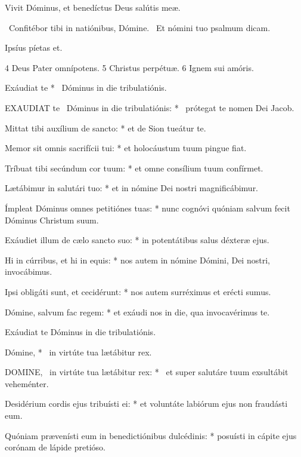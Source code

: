  Vivit Dóminus, et benedíctus Deus salútis meæ.


\V\ Confitébor tibi in natiónibus, Dómine. \R\ Et nómini tuo psalmum dicam.

 Ipsíus píetas et.

 4 Deus Pater omnípotens. 5 Christus perpétuæ. 6 Ignem sui amóris.


 Exáudiat te * \textdagger\ Dóminus in die tribulatiónis. \textdagger


\lettrine[lines=2]{E}{XAUDIAT} te \textdagger\ Dóminus in die tribulatiónis: * \textdagger\ prótegat te nomen Dei Jacob.

Mittat tibi auxílium de sancto: * et de Sion tueátur te.

Memor sit omnis sacrifícii tui: * et holocáustum tuum pingue fiat.

Tríbuat tibi secúndum cor tuum: * et omne consílium tuum confírmet.

Lætábimur in salutári tuo: * et in nómine Dei nostri magnificábimur.

Ímpleat Dóminus omnes petitiónes tuas: * nunc cognóvi quóniam salvum fecit Dóminus Christum suum.

Exáudiet illum de cælo sancto suo: * in potentátibus salus déxteræ ejus.

Hi in cúrribus, et hi in equis: * nos autem in nómine Dómini, Dei nostri, invocábimus.

Ipsi obligáti sunt, et cecidérunt: * nos autem surréximus et erécti sumus.

Dómine, salvum fac regem: * et exáudi nos in die, qua invocavérimus te.

 Exáudiat te Dóminus in die tribulatiónis.

 Dómine, * \textdagger\ in virtúte tua lætábitur rex. \textdaggerdbl


\lettrine[lines=2]{D}{OMINE}, \textdagger\ in virtúte tua lætábitur rex: * \textdaggerdbl\ et super salutáre tuum exsultábit veheménter.

Desidérium cordis ejus tribuísti ei: * et voluntáte labiórum ejus non fraudásti eum.

Quóniam prævenísti eum in benedictiónibus dulcédinis: * posuísti in cápite ejus corónam de lápide pretióso.

